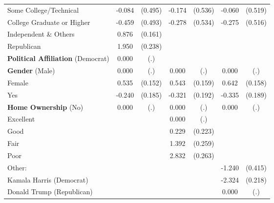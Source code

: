 \begin{table}[htbp]
\begin{tabular}{l*{3}{cc}}
Some College/Technical&      -0.084         &     (0.495)&      -0.174         &     (0.536)&      -0.060         &     (0.519)\\
College Graduate or Higher&      -0.459         &     (0.493)&      -0.278         &     (0.534)&      -0.275         &     (0.516)\\
Independent \& Others&       0.876\sym{***}&     (0.161)&                     &            &                     &            \\
Republican          &       1.950\sym{***}&     (0.238)&                     &            &                     &            \\
\textbf{Political Affiliation} (Democrat)&       0.000         &         (.)&                     &            &                     &            \\
\textbf{Gender} (Male)&       0.000         &         (.)&       0.000         &         (.)&       0.000         &         (.)\\
Female              &       0.535\sym{***}&     (0.152)&       0.543\sym{***}&     (0.159)&       0.642\sym{***}&     (0.158)\\
Yes                 &      -0.240         &     (0.185)&      -0.321\sym{*}  &     (0.192)&      -0.335\sym{*}  &     (0.189)\\
\textbf{Home Ownership} (No)&       0.000         &         (.)&       0.000         &         (.)&       0.000         &         (.)\\
Excellent           &                     &            &       0.000         &         (.)&                     &            \\
Good                &                     &            &       0.229         &     (0.223)&                     &            \\
Fair                &                     &            &       1.392\sym{***}&     (0.259)&                     &            \\
Poor                &                     &            &       2.832\sym{***}&     (0.263)&                     &            \\
Other:              &                     &            &                     &            &      -1.240\sym{***}&     (0.415)\\
Kamala Harris (Democrat)&                     &            &                     &            &      -2.324\sym{***}&     (0.218)\\
Donald Trump (Republican)&                     &            &                     &            &       0.000         &         (.)\\

\end{tabular}
\end{table}
